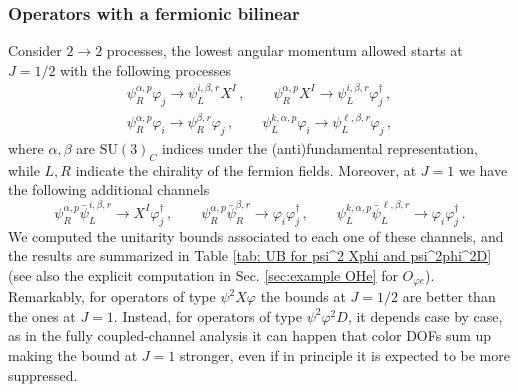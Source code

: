 \documentclass[a4paper,11pt]{article}
\begin{document}
\subsubsection{Operators with a fermionic bilinear}
Consider $2\to 2$ processes, the lowest angular momentum allowed starts at $J=1/2$ with the following processes
\begin{gather}
    \psi_R^{\alpha,p}\varphi_j\to \psi_L^{i,\beta,r}X^I\,,\qquad \psi_R^{\alpha,p}X^I\to \psi_L^{i,\beta,r}\varphi_j^\dag\,,\\
    \psi_R^{\alpha,p}\varphi_i\to\psi_R^{\beta,r}\varphi_j\,,\qquad    \psi_L^{k,\alpha,p}\varphi_i\to\psi_L^{\ell,\beta,r}\varphi_j\,,
\end{gather}
where $\alpha,\beta$ are $\mathrm{SU}(3)_C$ indices under the (anti)fundamental representation, while $L,R$ indicate the chirality of the fermion fields. Moreover, at $J=1$ we have the following additional channels
\begin{equation}
    \psi_R^{\alpha,p}\bar \psi_L^{i,\beta,r}\to X^I\varphi_j^\dag\,,\qquad \psi_R^{\alpha,p}\bar \psi_R^{\beta,r}\to\varphi_i\varphi_j^\dag\,, \qquad \psi_L^{k,\alpha,p}\bar \psi_L^{\ell,\beta,r}\to\varphi_i\varphi_j^\dag\,.
\end{equation}
We computed the unitarity bounds associated to each one of these channels, and the results are summarized in Table \ref{tab: UB for psi^2 Xphi and psi^2phi^2D} (see also the explicit computation in Sec. \ref{sec:example OHe} for $O_{\varphi e}$). Remarkably, for operators of type $\psi^2X\varphi$ the bounds at $J=1/2$ are better than the ones at $J=1$. Instead, for operators of type $\psi^2\varphi^2D$, it depends case by case, as in the fully coupled-channel analysis it can happen that color DOFs sum up making the bound at $J=1$ stronger, even if in principle it is expected to be more suppressed.
\end{document}
